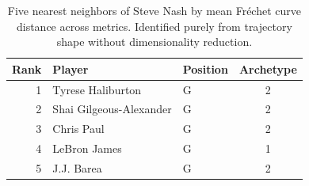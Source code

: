 \begin{table}[htbp]
  \centering\small
  \begin{tabular}{rllc}
    \toprule
    Rank & Player & Position & Archetype \\
    \midrule
    1 & Tyrese Haliburton & G & 2 \\
    2 & Shai Gilgeous-Alexander & G & 2 \\
    3 & Chris Paul & G & 2 \\
    4 & LeBron James & G & 1 \\
    5 & J.J. Barea & G & 2 \\
    \bottomrule
  \end{tabular}
  \caption{Five nearest neighbors of Steve Nash by mean Fr\'{e}chet curve distance across metrics. Identified purely from trajectory shape without dimensionality reduction.}
  \label{tab:Steve_Nash_frechet_curve_neighbors}
\end{table}

